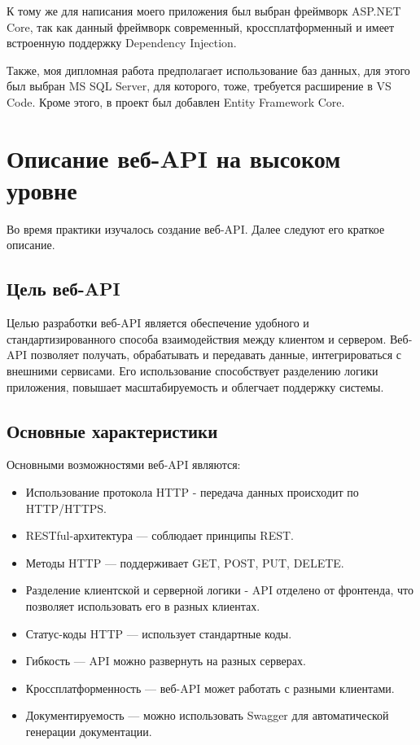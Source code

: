 \documentclass[a4paper,12pt]{report}
\begin{document}
К тому же для написания моего приложения был выбран фреймворк ASP.NET Core, так как данный фреймворк современный, 
кроссплатформенный и имеет встроенную поддержку Dependency Injection.

Также, моя дипломная работа предполагает использование баз данных, для этого был выбран MS SQL Server, для которого, тоже, требуется расширение в VS Code. 
Кроме этого, в проект был добавлен Entity Framework Core.

\section{Описание веб-\ac{API} на высоком уровне}

Во время практики изучалось создание веб-\ac{API}. Далее следуют его краткое описание.

\subsection{Цель веб-\ac{API}}

Целью разработки веб-\ac{API} является обеспечение удобного и стандартизированного способа взаимодействия между клиентом и сервером. 
Веб-\ac{API} позволяет получать, обрабатывать и передавать данные, интегрироваться с внешними сервисами. 
Его использование способствует разделению логики приложения, повышает масштабируемость и облегчает поддержку системы.

\subsection{Основные характеристики}

Основными возможностями веб-\ac{API} являются:
\begin{itemize}
  \item
      Использование протокола \ac{HTTP} - передача данных происходит по \ac{HTTP}/\ac{HTTPS}.
  \item
      \ac{REST}ful-архитектура --- соблюдает принципы \ac{REST}.
  \item
      Методы \ac{HTTP} --- поддерживает GET, POST, PUT, DELETE.
  \item
      Разделение клиентской и серверной логики - \ac{API} отделено от фронтенда, что позволяет использовать его в разных клиентах.
  \item
      Статус-коды \ac{HTTP} --- использует стандартные коды.
  \item
      Гибкость --- \ac{API} можно развернуть на разных серверах.
  \item
      Кроссплатформенность --- веб-\ac{API} может работать с разными клиентами.
  \item
      Документируемость --- можно использовать Swagger для автоматической генерации документации.
\end{itemize}
\end{document}
